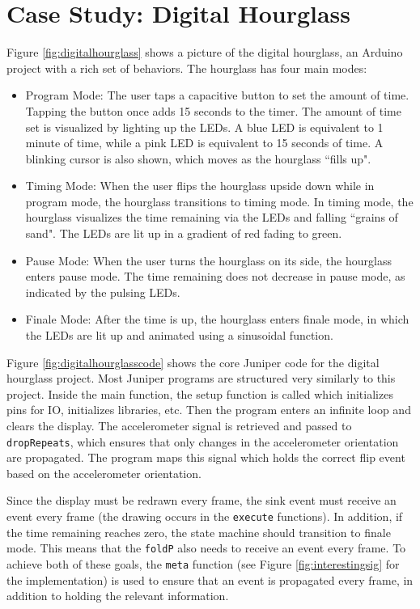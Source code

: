 \documentclass{sigplanconf}
\begin{document}
\section{Case Study: Digital Hourglass}
Figure \ref{fig:digitalhourglass} shows a picture of the digital hourglass, an Arduino project with a rich set of behaviors. The hourglass has four main modes:
\begin{itemize}
\item Program Mode: The user taps a capacitive button to set the amount of time. Tapping the button once adds 15 seconds to the timer. The amount of time set is visualized by lighting up the LEDs. A blue LED is equivalent to 1 minute of time, while a pink LED is equivalent to 15 seconds of time. A blinking cursor is also shown, which moves as the hourglass ``fills up".
\item Timing Mode: When the user flips the hourglass upside down while in program mode, the hourglass transitions to timing mode. In timing mode, the hourglass visualizes the time remaining via the LEDs and falling ``grains of sand". The LEDs are lit up in a gradient of red fading to green.
\item Pause Mode: When the user turns the hourglass on its side, the hourglass enters pause mode. The time remaining does not decrease in pause mode, as indicated by the pulsing LEDs.
\item Finale Mode: After the time is up, the hourglass enters finale mode, in which the LEDs are lit up and animated using a sinusoidal function.
\end{itemize}

Figure \ref{fig:digitalhourglasscode} shows the core Juniper code for the digital hourglass project. Most Juniper programs are structured very similarly to this project. Inside the main function, the setup function is called which initializes pins for IO, initializes libraries, etc. Then the program enters an infinite loop and clears the display. The accelerometer signal is retrieved and passed to \texttt{dropRepeats}, which ensures that only changes in the accelerometer orientation are propagated. The program maps this signal which holds the correct flip event based on the accelerometer orientation.

Since the display must be redrawn every frame, the sink event must receive an event every frame (the drawing occurs in the \texttt{execute} functions). In addition, if the time remaining reaches zero, the state machine should transition to finale mode. This means that the \texttt{foldP} also needs to receive an event every frame. To achieve both of these goals, the \texttt{meta} function (see Figure \ref{fig:interestingsig} for the implementation) is used to ensure that an event is propagated every frame, in addition to holding the relevant information.
\end{document}
